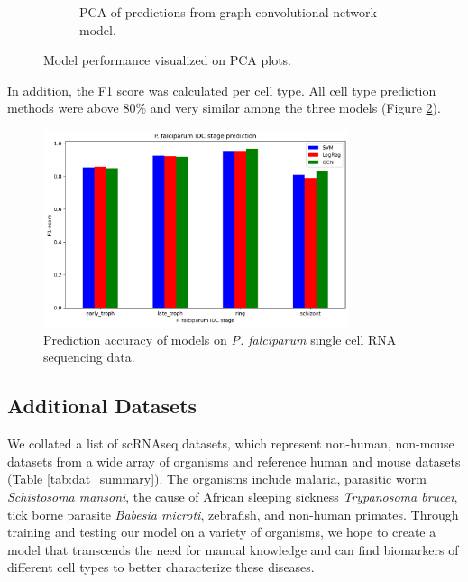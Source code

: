 \documentclass{article}
\begin{document}
\begin{figure}[!h]
\begin{subfigure}[b]{0.3\textwidth}
      \caption{PCA of predictions from graph convolutional network model.}
  \end{subfigure}
  
  \caption{Model performance visualized on PCA plots.}
  \label{fig:pfal_pca_pred}
\end{figure}


In addition, the F1 score was calculated per cell type. All cell type prediction methods were above 80\% and very similar among the three models (Figure \ref{fig:pfal_pred_f1}).

\begin{figure}[H]
  \centering
  \includegraphics[width=0.8\textwidth]{figures/Pf_prediction.png}
  \caption{Prediction accuracy of models on \textit{P. falciparum} single cell RNA sequencing data.}
	\label{fig:pfal_pred_f1}
\end{figure}

\subsection{Additional Datasets}

We collated a list of scRNAseq datasets, which represent non-human, non-mouse datasets from a wide array of organisms and reference human and mouse datasets (Table \ref{tab:dat_summary}). The organisms include malaria, parasitic worm \emph{Schistosoma mansoni}, the cause of African sleeping sickness \emph{Trypanosoma brucei}, tick borne parasite \emph{Babesia microti}, zebrafish, and non-human primates. Through training and testing our model on a variety of organisms, we hope to create a model that transcends the need for manual knowledge and can find biomarkers of different cell types to better characterize these diseases. 
\end{document}
